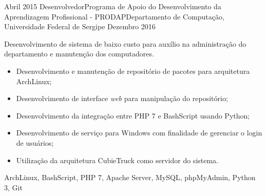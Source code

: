 \begin{experiences}
    \emptySeparator
    \experience
    {Abril 2015}       {Desenvolvedor}{Programa de Apoio do Desenvolvimento da Aprendizagem Profissional - PRODAP}{Departamento de Computação, Universidade Federal de Sergipe}
    {Dezembro 2016}
                    {
                        Desenvolvimento de sistema de baixo custo para auxílio na administração do departamento e manutenção dos computadores.
                        \begin{itemize}
                            \item Desenvolvimento e manutenção de repositório de pacotes para arquitetura ArchLinux;
                            \item Desenvolvimento de interface \textit{web} para manipulação do repositório;
                            \item Desenvolvimento da integração entre PHP 7 e BashScript usando Python;
                            \item Desenvolvimento de serviço para Windows com finalidade de gerenciar o login de usuários;
                            \item Utilização da arquitetura CubieTruck como servidor do sistema.
                        \end{itemize}
                    }
                    {ArchLinux, BashScript, PHP 7, Apache Server, MySQL, phpMyAdmin, Python 3, Git}
\end{experiences}
